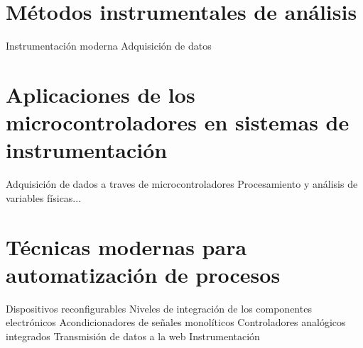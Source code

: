 \documentclass[11pt]{report}
\theoremstyle{plain}
\theoremstyle{definition}
\begin{document}

\chapter{Métodos instrumentales de análisis}

Instrumentación moderna
Adquisición de datos



\chapter{Aplicaciones de los microcontroladores en sistemas de instrumentación}

Adquisición de dados a traves de microcontroladores
Procesamiento y análisis de variables físicas...



\chapter{Técnicas modernas para automatización de procesos}
Dispositivos reconfigurables
Niveles de integración de los componentes electrónicos
Acondicionadores de señales monolíticos
Controladores analógicos integrados
Transmisión de datos a la web
Instrumentación





\end{document}
